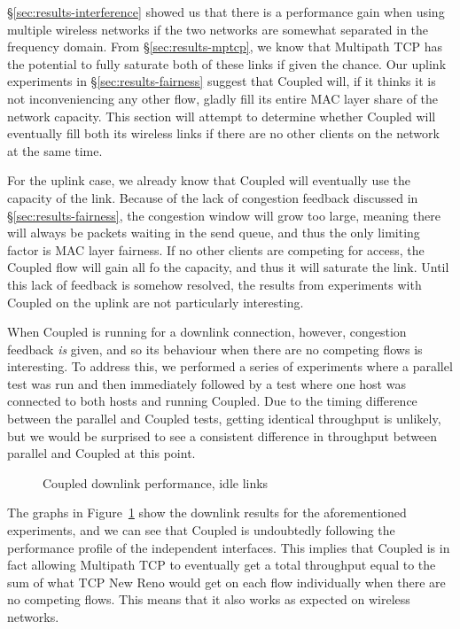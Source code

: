 \S\ref{sec:results-interference} showed us that there is a performance
gain when using multiple wireless networks if the two networks are somewhat 
separated in the frequency domain. From \S\ref{sec:results-mptcp}, we know that 
Multipath TCP has the potential to fully saturate both of these links if given 
the chance. Our uplink experiments in \S\ref{sec:results-fairness} suggest that 
Coupled will, if it thinks it is not inconveniencing any other flow, gladly fill 
its entire MAC layer share of the network capacity. This section will attempt to 
determine whether Coupled will eventually fill both its wireless links if there 
are no other clients on the network at the same time.

For the uplink case, we already know that Coupled will eventually use the
capacity of the link. Because of the lack of congestion feedback discussed in
\S\ref{sec:results-fairness}, the congestion window will grow too large,
meaning there will always be packets waiting in the send queue, and thus the
only limiting factor is MAC layer fairness. If no other clients are competing
for access, the Coupled flow will gain all fo the capacity, and thus it
will saturate the link. Until this lack of feedback is somehow resolved, the 
results from experiments with Coupled on the uplink are not particularly
interesting.

When Coupled is running for a downlink connection, however, congestion feedback
\emph{is} given, and so its behaviour when there are no competing flows is 
interesting. To address this, we performed a series of 
experiments where a parallel test was run and then immediately followed by a 
test where one host was connected to both hosts and running Coupled. Due to the 
timing difference between the parallel and Coupled tests, getting identical 
throughput is unlikely, but we would be surprised to see a consistent difference 
in throughput between parallel and Coupled at this point.

\begin{figure}[h]
 \centering
 
 \caption{Coupled downlink performance, idle links}\label{graph:coupled-performance}
\end{figure}

The graphs in Figure~\ref{graph:coupled-performance} show the downlink results
for the aforementioned experiments, and we can see that Coupled is undoubtedly
following the performance profile of the independent interfaces. This implies
that Coupled is in fact allowing Multipath TCP to eventually get a total
throughput equal to the sum of what TCP New Reno would get on each flow
individually when there are no competing flows. This means that it also works as
expected on wireless networks.
